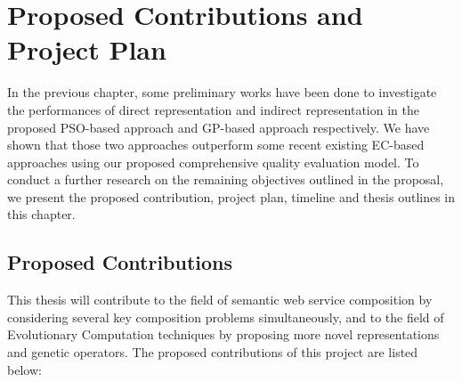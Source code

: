 \chapter{Proposed Contributions and Project Plan}\label{C:plan}
In the previous chapter, some preliminary works have been done to investigate the performances of direct representation and indirect representation in the proposed PSO-based approach and GP-based approach respectively. We have shown that those two approaches outperform some recent existing EC-based approaches using our proposed comprehensive quality evaluation model. To conduct a further research on the remaining objectives outlined in the proposal, we present the proposed contribution, project plan, timeline and thesis outlines in this chapter.

\section{Proposed Contributions}
This thesis will contribute to the field of semantic web service composition by considering several key composition problems simultaneously, and to the field of Evolutionary Computation techniques by proposing more novel representations and genetic operators. The proposed contributions of this project are listed below:

